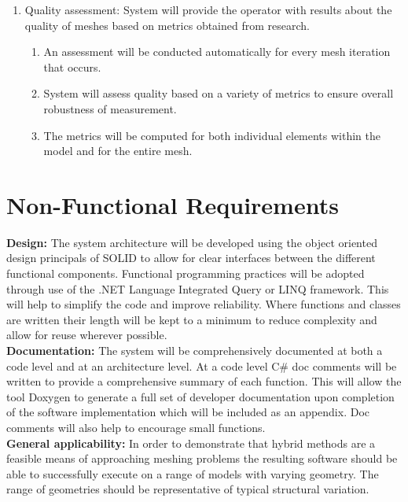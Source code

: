 \documentclass{article}
\begin{document}
\begin{enumerate}
\item Quality assessment: System will provide the operator with results about the quality of meshes based on metrics obtained from research.

\begin{enumerate}
\item An assessment will be conducted automatically for every mesh iteration that occurs.
\item System will assess quality based on a variety of metrics to ensure overall robustness of measurement. 
\item The metrics will be computed for both individual elements within the model and for the entire mesh.
\end{enumerate}
\end{enumerate}

\section{Non-Functional Requirements}


\textbf{Design:} The system architecture will be developed using the object oriented design principals of SOLID to allow for clear interfaces between the different functional components. Functional programming practices will be adopted through use of the .NET Language Integrated Query or LINQ framework. This will help to simplify the code and improve reliability. Where functions and classes are written their length will be kept to a minimum to reduce complexity and allow for reuse wherever possible. \\ 

\noindent
\textbf{Documentation:} The system will be comprehensively documented at both a code level and at an architecture level. At a code level C\# doc comments will be written to provide a comprehensive summary of each function. This will allow the tool Doxygen \cite{Doxygen} to generate a full set of developer documentation upon completion of the software implementation which will be included as an appendix. Doc comments will also help to encourage small functions. \\

\noindent
\textbf{General applicability:} In order to demonstrate that hybrid methods are a feasible means of approaching meshing problems the resulting software should be able to successfully execute on a range of models with varying geometry. The range of geometries should be representative of typical structural variation.
\end{document}
